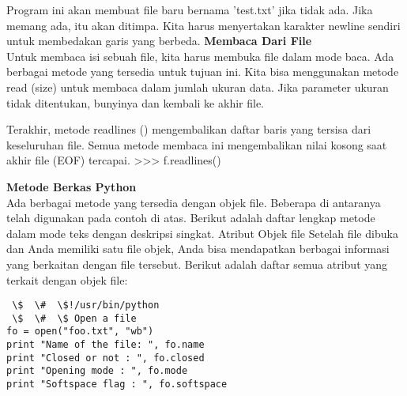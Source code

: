 Program ini akan membuat file baru bernama 'test.txt' jika tidak ada. Jika memang ada, itu akan ditimpa. Kita harus menyertakan karakter newline sendiri untuk membedakan garis yang berbeda. 
{\fontsize{14pt}{14pt}\selectfont \textbf{Membaca Dari File} \\} 
Untuk membaca isi sebuah file, kita harus membuka file dalam mode baca. Ada berbagai metode yang tersedia untuk tujuan ini. Kita bisa menggunakan metode read (size) untuk membaca dalam jumlah ukuran data. Jika parameter ukuran tidak ditentukan, bunyinya dan kembali ke akhir file.  

Terakhir, metode readlines () mengembalikan daftar baris yang tersisa dari keseluruhan file. Semua metode membaca ini mengembalikan nilai kosong saat akhir file (EOF) tercapai.  
>>> f.readlines()  

{\fontsize{14pt}{14pt}\selectfont \textbf{Metode Berkas Python} \\} 
Ada berbagai metode yang tersedia dengan objek file. Beberapa di antaranya telah digunakan pada contoh di atas. Berikut adalah daftar lengkap metode dalam mode teks dengan deskripsi singkat. Atribut Objek file Setelah file dibuka dan Anda memiliki satu file objek, Anda bisa mendapatkan berbagai informasi yang berkaitan dengan file tersebut. Berikut adalah daftar semua atribut yang terkait dengan objek file: 

\begin{verbatim}
 \$  \#  \$!/usr/bin/python 
 \$  \#  \$ Open a file  
fo = open("foo.txt", "wb") 
print "Name of the file: ", fo.name 
print "Closed or not : ", fo.closed 
print "Opening mode : ", fo.mode 
print "Softspace flag : ", fo.softspace  
\end{verbatim}

